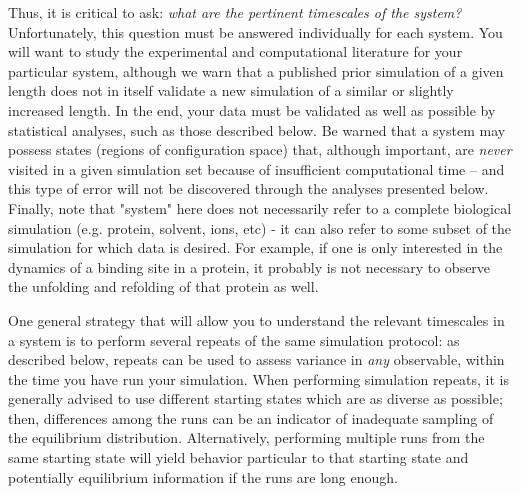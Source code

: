 Thus, it is critical to ask: \emph{what are the pertinent timescales of the system?} 
Unfortunately, this question must be answered individually for each system.  You will want to study the experimental and computational literature for your particular system, although we warn that a published prior simulation of a given length does not in itself validate a new simulation of a similar or slightly increased length.  In the end, your data must be validated as well as possible by statistical analyses, such as those described below.  Be warned that a system may possess states (regions of configuration space) that, although important, are \emph{never} visited in a given simulation set because of insufficient computational time \cite{Grossfield2009} -- and this type of error will not be discovered through the analyses presented below.
Finally, note that "system" here does not necessarily refer to a complete biological simulation (e.g. protein, solvent, ions, etc) - it can also refer to some subset of the simulation for which data is desired.  For example, if one is only interested in the dynamics of a binding site in a protein, it probably is not necessary to observe the unfolding and refolding of that protein as well.

One general strategy that will allow you to understand the relevant timescales in a system is to perform several repeats of the same simulation protocol: as described below, repeats can be used to assess variance in \emph{any} observable, within the time you have run your simulation.
When performing simulation repeats, it is generally advised to use different starting states which are as diverse as possible; then, differences among the runs can be an indicator of inadequate sampling of the equilibrium distribution.
Alternatively, performing multiple runs from the same starting state will yield behavior particular to that starting state and potentially equilibrium information if the runs are long enough.



